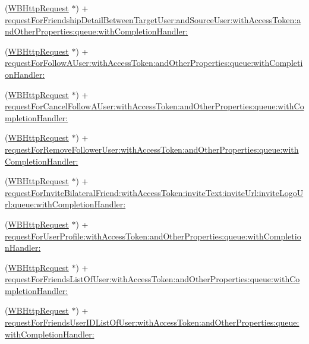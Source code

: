 \begin{DoxyCompactItemize}
\item 
(\mbox{\hyperlink{interface_w_b_http_request}{W\+B\+Http\+Request}} $\ast$) + \mbox{\hyperlink{category_w_b_http_request_07_weibo_user_08_a6e438b749b6311301808d7ae0923d7c3}{request\+For\+Friendship\+Detail\+Between\+Target\+User\+:and\+Source\+User\+:with\+Access\+Token\+:and\+Other\+Properties\+:queue\+:with\+Completion\+Handler\+:}}
\item 
(\mbox{\hyperlink{interface_w_b_http_request}{W\+B\+Http\+Request}} $\ast$) + \mbox{\hyperlink{category_w_b_http_request_07_weibo_user_08_a857eebccc3b26b8d7c5bbc38a3ae2627}{request\+For\+Follow\+A\+User\+:with\+Access\+Token\+:and\+Other\+Properties\+:queue\+:with\+Completion\+Handler\+:}}
\item 
(\mbox{\hyperlink{interface_w_b_http_request}{W\+B\+Http\+Request}} $\ast$) + \mbox{\hyperlink{category_w_b_http_request_07_weibo_user_08_a0a601918d65f1776f99882facc1349e3}{request\+For\+Cancel\+Follow\+A\+User\+:with\+Access\+Token\+:and\+Other\+Properties\+:queue\+:with\+Completion\+Handler\+:}}
\item 
(\mbox{\hyperlink{interface_w_b_http_request}{W\+B\+Http\+Request}} $\ast$) + \mbox{\hyperlink{category_w_b_http_request_07_weibo_user_08_abb1e37b606f28ab890279b1ce62de963}{request\+For\+Remove\+Follower\+User\+:with\+Access\+Token\+:and\+Other\+Properties\+:queue\+:with\+Completion\+Handler\+:}}
\item 
(\mbox{\hyperlink{interface_w_b_http_request}{W\+B\+Http\+Request}} $\ast$) + \mbox{\hyperlink{category_w_b_http_request_07_weibo_user_08_a82d133ab6df8bbd0b61a6bbdd56fa499}{request\+For\+Invite\+Bilateral\+Friend\+:with\+Access\+Token\+:invite\+Text\+:invite\+Url\+:invite\+Logo\+Url\+:queue\+:with\+Completion\+Handler\+:}}
\item 
(\mbox{\hyperlink{interface_w_b_http_request}{W\+B\+Http\+Request}} $\ast$) + \mbox{\hyperlink{category_w_b_http_request_07_weibo_user_08_ac5c54cd942ec3972dce639a4a299d812}{request\+For\+User\+Profile\+:with\+Access\+Token\+:and\+Other\+Properties\+:queue\+:with\+Completion\+Handler\+:}}
\item 
(\mbox{\hyperlink{interface_w_b_http_request}{W\+B\+Http\+Request}} $\ast$) + \mbox{\hyperlink{category_w_b_http_request_07_weibo_user_08_a6bec26ae942e00b30352846353c10f4d}{request\+For\+Friends\+List\+Of\+User\+:with\+Access\+Token\+:and\+Other\+Properties\+:queue\+:with\+Completion\+Handler\+:}}
\item 
(\mbox{\hyperlink{interface_w_b_http_request}{W\+B\+Http\+Request}} $\ast$) + \mbox{\hyperlink{category_w_b_http_request_07_weibo_user_08_a388ba16ea6e89e121893833f2a7d7b86}{request\+For\+Friends\+User\+I\+D\+List\+Of\+User\+:with\+Access\+Token\+:and\+Other\+Properties\+:queue\+:with\+Completion\+Handler\+:}}

\end{DoxyCompactItemize}
